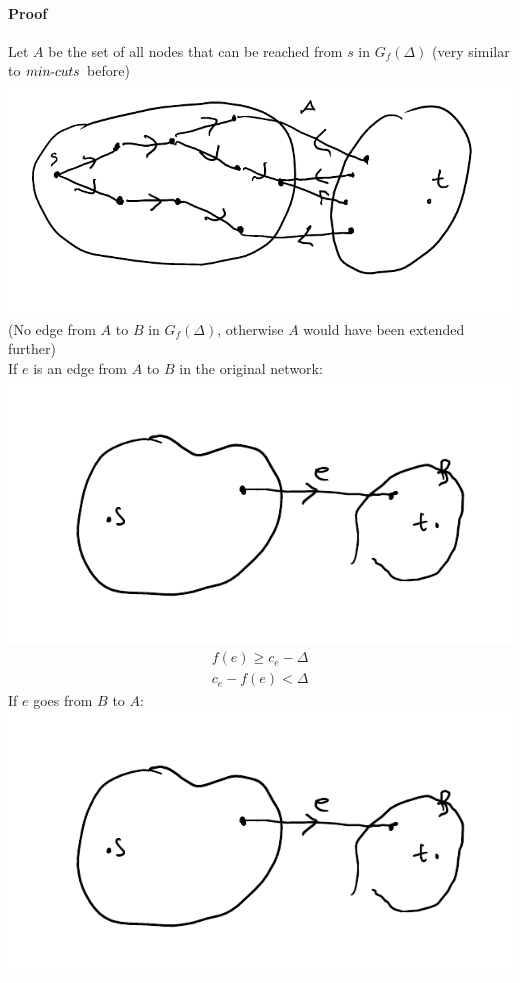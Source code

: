 \documentclass[12 pt]{article}
\begin{document}
        \paragraph{Proof} Let $A$ be the set of all nodes that can be
        reached from $s$ in $G_f(\Delta)$ (very similar to $min\hbox{-}cuts$
        before)
        \\ \includegraphics[width=.9\textwidth]{i40.pdf}
        \\ (No edge from $A$ to $B$ in $G_f(\Delta)$, otherwise $A$
        would have been extended further)
        \\ If $e$ is an edge from $A$ to $B$ in the original network:
        \\ \includegraphics[width=.9\textwidth]{i41.pdf}
        \begin{align*}
          f(e) \geq c_e - \Delta
          \\ c_e - f(e) < \Delta
        \end{align*}
        If $e$ goes from $B$ to $A$:
        \\\includegraphics[width=.9\textwidth]{i41.pdf}
\end{document}
